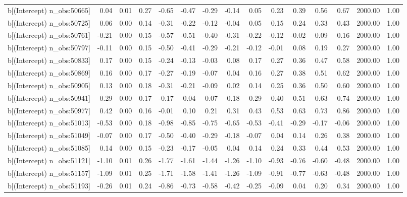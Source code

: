 \begin{table}[ht]
\begin{tabular}{rrrrrrrrrrrrrrr}
  b[(Intercept) n\_obs:50665] & 0.04 & 0.01 & 0.27 & -0.65 & -0.47 & -0.29 & -0.14 & 0.05 & 0.23 & 0.39 & 0.56 & 0.67 & 2000.00 & 1.00 \\ 
  b[(Intercept) n\_obs:50725] & 0.06 & 0.00 & 0.14 & -0.31 & -0.22 & -0.12 & -0.04 & 0.05 & 0.15 & 0.24 & 0.33 & 0.43 & 2000.00 & 1.00 \\ 
  b[(Intercept) n\_obs:50761] & -0.21 & 0.00 & 0.15 & -0.57 & -0.51 & -0.40 & -0.31 & -0.22 & -0.12 & -0.02 & 0.09 & 0.16 & 2000.00 & 1.00 \\ 
  b[(Intercept) n\_obs:50797] & -0.11 & 0.00 & 0.15 & -0.50 & -0.41 & -0.29 & -0.21 & -0.12 & -0.01 & 0.08 & 0.19 & 0.27 & 2000.00 & 1.00 \\ 
  b[(Intercept) n\_obs:50833] & 0.17 & 0.00 & 0.15 & -0.24 & -0.13 & -0.03 & 0.08 & 0.17 & 0.27 & 0.36 & 0.47 & 0.58 & 2000.00 & 1.00 \\ 
  b[(Intercept) n\_obs:50869] & 0.16 & 0.00 & 0.17 & -0.27 & -0.19 & -0.07 & 0.04 & 0.16 & 0.27 & 0.38 & 0.51 & 0.62 & 2000.00 & 1.00 \\ 
  b[(Intercept) n\_obs:50905] & 0.13 & 0.00 & 0.18 & -0.31 & -0.21 & -0.09 & 0.02 & 0.14 & 0.25 & 0.36 & 0.50 & 0.60 & 2000.00 & 1.00 \\ 
  b[(Intercept) n\_obs:50941] & 0.29 & 0.00 & 0.17 & -0.17 & -0.04 & 0.07 & 0.18 & 0.29 & 0.40 & 0.51 & 0.63 & 0.74 & 2000.00 & 1.00 \\ 
  b[(Intercept) n\_obs:50977] & 0.42 & 0.00 & 0.16 & -0.01 & 0.10 & 0.21 & 0.31 & 0.43 & 0.53 & 0.63 & 0.73 & 0.86 & 2000.00 & 1.00 \\ 
  b[(Intercept) n\_obs:51013] & -0.53 & 0.00 & 0.18 & -0.98 & -0.85 & -0.75 & -0.65 & -0.53 & -0.41 & -0.29 & -0.17 & -0.06 & 2000.00 & 1.00 \\ 
  b[(Intercept) n\_obs:51049] & -0.07 & 0.00 & 0.17 & -0.50 & -0.40 & -0.29 & -0.18 & -0.07 & 0.04 & 0.14 & 0.26 & 0.38 & 2000.00 & 1.00 \\ 
  b[(Intercept) n\_obs:51085] & 0.14 & 0.00 & 0.15 & -0.23 & -0.17 & -0.05 & 0.04 & 0.14 & 0.24 & 0.33 & 0.44 & 0.53 & 2000.00 & 1.00 \\ 
  b[(Intercept) n\_obs:51121] & -1.10 & 0.01 & 0.26 & -1.77 & -1.61 & -1.44 & -1.26 & -1.10 & -0.93 & -0.76 & -0.60 & -0.48 & 2000.00 & 1.00 \\ 
  b[(Intercept) n\_obs:51157] & -1.09 & 0.01 & 0.25 & -1.71 & -1.58 & -1.41 & -1.26 & -1.09 & -0.91 & -0.77 & -0.63 & -0.48 & 2000.00 & 1.00 \\ 
  b[(Intercept) n\_obs:51193] & -0.26 & 0.01 & 0.24 & -0.86 & -0.73 & -0.58 & -0.42 & -0.25 & -0.09 & 0.04 & 0.20 & 0.34 & 2000.00 & 1.00 \\ 

\end{tabular}
\end{table}
